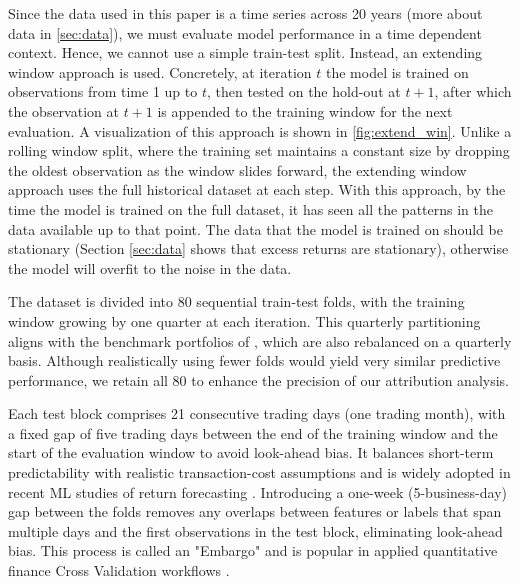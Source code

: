 Since the data used in this paper is a time series across 20 years (more about data in \ref{sec:data}), we must evaluate model performance in a time dependent context. Hence, we cannot use a simple train-test split. Instead, an extending window approach is used. Concretely, at iteration $t$ the model is trained on observations from time 1 up to $t$, then tested on the hold-out at $t+1$, after which the observation at $t+1$ is appended to the training window for the next evaluation. A visualization of this approach is shown in \ref{fig:extend_win}. Unlike a rolling window split, where the training set maintains a constant size by dropping the oldest observation as the window slides forward, the extending window approach uses the full historical dataset at each step. With this approach, by the time the model is trained on the full dataset, it has seen all the patterns in the data available up to that point. The data that the model is trained on should be stationary (Section \ref{sec:data} shows that excess returns are stationary), otherwise the model will overfit to the noise in the data.

The dataset is divided into 80 sequential train-test folds, with the training window growing by one quarter at each iteration. This quarterly partitioning aligns with the benchmark portfolios of , which are also rebalanced on a quarterly basis. Although realistically using fewer folds would yield very similar predictive performance, we retain all 80 to enhance the precision of our attribution analysis.

Each test block comprises 21 consecutive trading days (one trading month), with a fixed gap of five trading days between the end of the training window and the start of the evaluation window to avoid look-ahead bias. It balances short-term predictability with realistic transaction-cost assumptions and is widely adopted in recent ML studies of return forecasting \cite{htun_2024}. Introducing a one-week (5-business-day) gap between the folds removes any overlaps between features or labels that span multiple days and the first observations in the test block, eliminating look-ahead bias. This process is called an "Embargo" and is popular in applied quantitative finance Cross Validation workflows \cite{embargo_2020}. %


